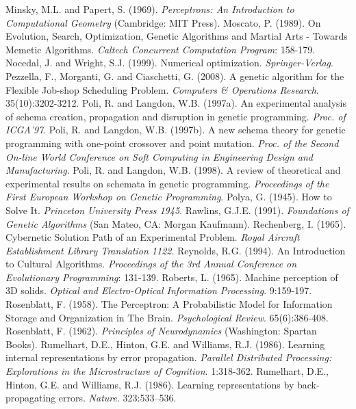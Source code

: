 \documentclass[spanish,a4paper,12pt,twoside]{report}
\begin{document}
\begin{thebibliography}{00}
   Minsky, M.L. and Papert, S. (1969). \emph{Perceptrons: An Introduction to Computational Geometry} (Cambridge: MIT Press).
   Moscato, P. (1989). On Evolution, Search, Optimization, Genetic Algorithms and Martial Arts - Towards Memetic Algorithms. \emph{Caltech Concurrent Computation Program}: 158-179.
   Nocedal, J. and Wright, S.J. (1999). Numerical optimization. \emph{Springer-Verlag}.
   Pezzella, F., Morganti, G. and Ciaschetti, G. (2008). A genetic algorithm for the Flexible Job-shop Scheduling Problem. \emph{Computers \& Operations Research}. 35(10):3202-3212.
   Poli, R. and Langdon, W.B. (1997a). An experimental analysis of schema creation, propagation and disruption in genetic programming. \emph{Proc. of ICGA'97}.
   Poli, R. and Langdon, W.B. (1997b). A new schema theory for genetic programming with one-point crossover and point mutation. \emph{Proc. of the Second On-line World Conference on Soft Computing in Engineering Design and Manufacturing}.
   Poli, R. and Langdon, W.B. (1998). A review of theoretical and experimental results on schemata in genetic programming. \emph{Proceedings of the First European Workshop on Genetic Programming}.
   Polya, G. (1945). How to Solve It. \emph{Princeton University Press 1945}.
   Rawlins, G.J.E. (1991). \emph{Foundations of Genetic Algorithms} (San Mateo, CA: Morgan Kaufmann).
   Rechenberg, I. (1965). Cybernetic Solution Path of an Experimental Problem. \emph{Royal Aircraft Establishment Library Translation 1122}.
   Reynolds, R.G. (1994). An Introduction to Cultural Algorithms. \emph{Proceedings of the 3rd Annual Conference on Evolutionary Programming}: 131-139.
   Roberts, L. (1965). Machine perception of 3D solids. \emph{Optical and Electro-Optical Information Processing}. 9:159-197.
   Rosenblatt, F. (1958). The Perceptron: A Probabilistic Model for Information Storage and Organization in The Brain. \emph{Psychological Review}. 65(6):386-408.
   Rosenblatt, F. (1962). \emph{Principles of Neurodynamics} (Washington: Spartan Books). 
   Rumelhart, D.E., Hinton, G.E. and Williams, R.J. (1986). Learning internal representations by error propagation. \emph{Parallel Distributed Processing: Explorations in the Microstructure of Cognition}. 1:318-362.
   Rumelhart, D.E., Hinton, G.E. and Williams, R.J. (1986). Learning representations by back-propagating errors. \emph{Nature}. 323:533–536.

\end{thebibliography}
\end{document}
